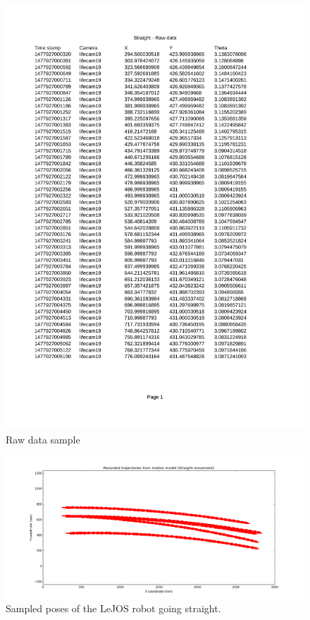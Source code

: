 \documentclass[paper=a4, fontsize=11pt]{scrartcl} %
\begin{document}
    \begin{figure}[h!]
        \begin{center}
            \setlength{\fboxsep}{0.5pt} %
            \setlength{\fboxrule}{0.5pt}
            \includegraphics[width=12cm,fbox]{images/Raw_data}
            \caption{Raw data sample}
            \label{Raw_data}
        \end{center}
    \end{figure}

    \begin{figure}[h!]
	\begin{center}
		\setlength{\fboxsep}{0.5pt} %
		\setlength{\fboxrule}{0.5pt}
		\includegraphics[width=12cm,fbox]{images/raw_straight.png}
		\caption{Sampled poses of the LeJOS robot going straight.}
	\end{center}
	\end{figure}
\end{document}
